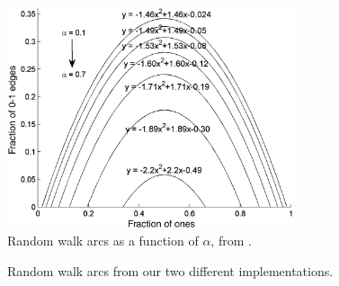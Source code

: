 \documentclass[11pt]{article}
\begin{document}
\begin{figure}
  \centering
  \includegraphics[height=65mm]{durretArcs}
  \caption{Random walk arcs as a function of $\alpha$, from \cite{durret:pnas12}.}
  \label{fig:durretArcs}
\end{figure}

\begin{figure}
  \centering
  \hspace{3mm}
  \caption{Random walk arcs from our two different implementations.}
  \label{fig:myArcs}
\end{figure}
\end{document}

